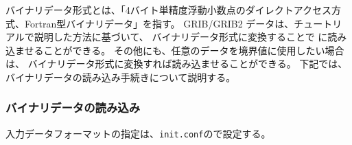 バイナリデータ形式とは、「4バイト単精度浮動小数点のダイレクトアクセス方式、Fortran型バイナリデータ」を指す。
GRIB/GRIB2 データは、チュートリアルで説明した方法に基づいて、
バイナリデータ形式に変換することで {\scalerm} に読み込ませることができる。
その他にも、任意のデータを境界値に使用したい場合は、
バイナリデータ形式に変換すれば読み込ませることができる。
下記では、バイナリデータの読み込み手続きについて説明する。

\subsubsection{バイナリデータの読み込み} \label{sec:datainput_grads}

入力データフォーマットの指定は、\verb|init.conf|ので設定する。\\

